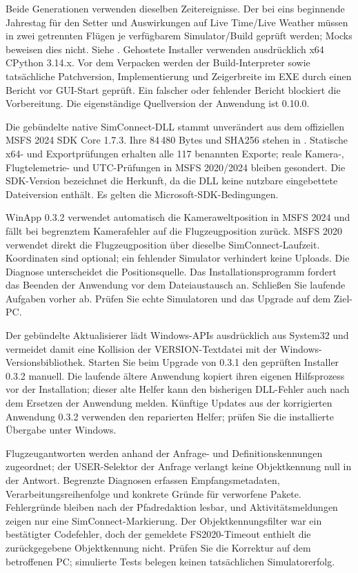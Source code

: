 \documentclass[11pt,a4paper]{article}
\newcommand{\filepath}[1]{\path{#1}}
\begin{document}
Beide Generationen verwenden dieselben Zeitereignisse. Der bei eins beginnende
Jahrestag für den Setter und Auswirkungen auf Live Time/Live Weather müssen in
zwei getrennten Flügen je verfügbarem Simulator/Build geprüft werden; Mocks
beweisen dies nicht. Siehe \filepath{winapp/README.md}. Gehostete Installer
verwenden ausdrücklich x64 CPython 3.14.x. Vor dem Verpacken werden der
Build-Interpreter sowie tatsächliche Patchversion, Implementierung und
Zeigerbreite im EXE durch einen Bericht vor GUI-Start geprüft. Ein falscher
oder fehlender Bericht blockiert die Vorbereitung. Die eigenständige
Quellversion der Anwendung ist 0.10.0.

Die gebündelte native SimConnect-DLL stammt unverändert aus dem offiziellen
MSFS 2024 SDK Core 1.7.3. Ihre 84\,480 Bytes und SHA256 stehen in
\filepath{winapp/README.md}. Statische x64- und Exportprüfungen erhalten alle
117 benannten Exporte; reale Kamera-, Flugtelemetrie- und UTC-Prüfungen in
MSFS 2020/2024 bleiben gesondert. Die SDK-Version bezeichnet die Herkunft,
da die DLL keine nutzbare eingebettete Dateiversion enthält. Es gelten die
Microsoft-SDK-Bedingungen.

WinApp 0.3.2 verwendet automatisch die Kameraweltposition in MSFS 2024 und fällt
bei begrenztem Kamerafehler auf die Flugzeugposition zurück. MSFS 2020 verwendet
direkt die Flugzeugposition über dieselbe SimConnect-Laufzeit. Koordinaten sind
optional; ein fehlender Simulator verhindert keine Uploads. Die Diagnose
unterscheidet die Positionsquelle. Das Installationsprogramm fordert das Beenden
der Anwendung vor dem Dateiaustausch an. Schließen Sie laufende Aufgaben vorher
ab. Prüfen Sie echte Simulatoren und das Upgrade auf dem Ziel-PC.

Der gebündelte Aktualisierer lädt Windows-APIs ausdrücklich aus System32 und
vermeidet damit eine Kollision der VERSION-Textdatei mit der
Windows-Versionsbibliothek. Starten Sie beim Upgrade von 0.3.1 den geprüften
Installer 0.3.2 manuell. Die laufende ältere Anwendung kopiert ihren eigenen
Hilfsprozess vor der Installation; dieser alte Helfer kann den bisherigen
DLL-Fehler auch nach dem Ersetzen der Anwendung melden. Künftige Updates aus der
korrigierten Anwendung 0.3.2 verwenden den reparierten Helfer; prüfen Sie die
installierte Übergabe unter Windows.

Flugzeugantworten werden anhand der Anfrage- und Definitionskennungen
zugeordnet; der USER-Selektor der Anfrage verlangt keine Objektkennung null in
der Antwort. Begrenzte Diagnosen erfassen Empfangsmetadaten,
Verarbeitungsreihenfolge und konkrete Gründe für verworfene Pakete. Fehlergründe
bleiben nach der Pfadredaktion lesbar, und Aktivitätsmeldungen zeigen nur eine
SimConnect-Markierung. Der Objektkennungsfilter war ein bestätigter Codefehler,
doch der gemeldete FS2020-Timeout enthielt die zurückgegebene Objektkennung
nicht. Prüfen Sie die Korrektur auf dem betroffenen PC; simulierte Tests belegen
keinen tatsächlichen Simulatorerfolg.
\end{document}

